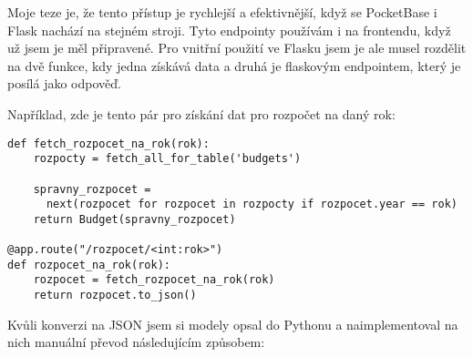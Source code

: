 \documentclass[11pt,a4paper,twoside,openright]{report}
\begin{document}
Moje teze je, že tento přístup je rychlejší a efektivnější, když se PocketBase i Flask nachází na stejném
stroji. Tyto endpointy používám i na frontendu, když už jsem je měl připravené. Pro vnitřní použití ve
Flasku jsem je ale musel rozdělit na dvě funkce, kdy jedna získává data a druhá je flaskovým endpointem,
který je posílá jako odpověď.

Například, zde je tento pár pro získání dat pro rozpočet na daný rok:

\begin{verbatim}
def fetch_rozpocet_na_rok(rok):
    rozpocty = fetch_all_for_table('budgets')

    spravny_rozpocet =
      next(rozpocet for rozpocet in rozpocty if rozpocet.year == rok)
    return Budget(spravny_rozpocet)

@app.route("/rozpocet/<int:rok>")
def rozpocet_na_rok(rok):
    rozpocet = fetch_rozpocet_na_rok(rok)
    return rozpocet.to_json()
\end{verbatim}

Kvůli konverzi na JSON jsem si modely opsal do Pythonu a naimplementoval na nich manuální převod
následujícím způsobem:
\end{document}

